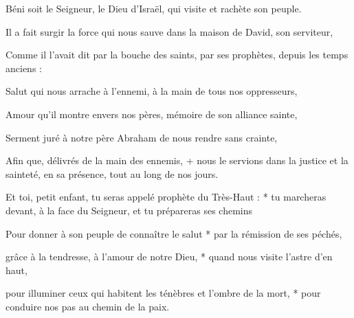 \item Béni soit le Seigneur, le Dieu d'Israël,
qui visite et rachète son peuple.

\item Il a fait surgir la force qui nous sauve
dans la maison de David, son serviteur,

\item Comme il l'avait dit par la bouche des saints,
par ses prophètes, depuis les temps anciens :

\item Salut qui nous arrache à l'ennemi,
à la main de tous nos oppresseurs,

\item Amour qu'il montre envers nos pères,
mémoire de son alliance sainte,

\item Serment juré à notre père Abraham
   de nous rendre sans crainte,

\item Afin que, délivrés de la main des ennemis, +
nous le servions dans la justice et la sainteté,
en sa présence, tout au long de nos jours.

\item Et toi, petit enfant, tu seras appelé
   prophète du Très-Haut : *
tu marcheras devant, à la face du Seigneur,
   et tu prépareras ses chemins

\item Pour donner à son peuple de connaître le salut *
par la rémission de ses péchés,

\item grâce à la tendresse, à l'amour de notre Dieu, *
quand nous visite l'astre d'en haut,

\item pour illuminer ceux qui habitent les ténèbres
   et l'ombre de la mort, *
pour conduire nos pas
   au chemin de la paix.
